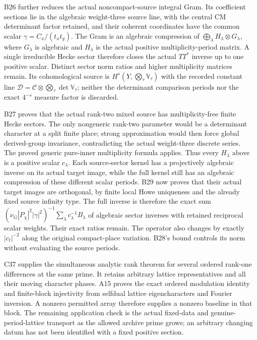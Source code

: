 \documentclass[11pt]{article}
\providecommand{\mathscr}[1]{\mathcal{#1}}
\theoremstyle{definition}\newtheorem{definition}[theorem]{Definition}\newtheorem{remark}[theorem]{Remark}
\begin{document}
B26 further reduces the actual noncompact-source integral Gram.
Its coefficient sections lie in the algebraic weight-three
source line, with the central CM determinant factor retained,
and their coherent coordinates have the common scalar
$\gamma=C_x/(t_x t_y)$. The Gram is an algebraic compression
of $\bigoplus_\lambda H_\lambda\otimes G_\lambda$, where
$G_\lambda$ is algebraic and $H_\lambda$ is the actual positive
multiplicity-period matrix. A single irreducible Hecke sector
therefore closes the actual $TT^*$ inverse up to one positive
scalar. Distinct sector norm ratios and higher multiplicity
matrices remain. Its cohomological source is
$H^s(Y,\bigotimes_\tau\mathbb V_\tau)$ with the recorded
constant line $\mathscr D=\mathscr C\otimes\bigotimes_\tau
\det\mathbb V_\tau$; neither the determinant comparison periods
nor the exact $4^{-s}$ measure factor is discarded.

B27 proves that the actual rank-two mixed source has
multiplicity-free finite Hecke sectors. The only nongeneric
rank-two parameter would be a determinant character at a
split finite place; strong approximation would then force
global derived-group invariance, contradicting the actual
weight-three discrete series. The proved generic pure-inner
multiplicity formula applies. Thus every $H_\lambda$ above
is a positive scalar $c_\lambda$. Each source-sector kernel
has a projectively algebraic inverse on its actual target
image, while the full kernel still has an algebraic
compression of these different scalar periods. B29 now proves
that their actual target images are orthogonal, by finite local
Howe uniqueness and the already fixed source infinity type.
The full inverse is therefore the exact sum
$(\nu_G|P_\chi|^2|\gamma|^2)^{-1}
\sum_\lambda c_\lambda^{-1}B_\lambda$ of algebraic sector
inverses with retained reciprocal scalar weights. Their exact
ratios remain. The operator also changes by exactly
$|c_t|^{-2}$ along the original compact-place variation.
B28's bound controls its norm without evaluating the source
periods.

C37 supplies the simultaneous analytic rank theorem for several
ordered rank-one differences at the same prime. It retains arbitrary
lattice representatives and all their moving character phases. A15 proves the exact ordered modulation identity and finite-block
injectivity from selfdual lattice eigencharacters and Fourier
inversion. A nonzero permitted array therefore supplies a nonzero
baseline in that block. The remaining application check is the
actual fixed-data and genuine-period-lattice transport as the
allowed archive prime grows; an arbitrary changing datum has
not been identified with a fixed positive section.
\end{document}

